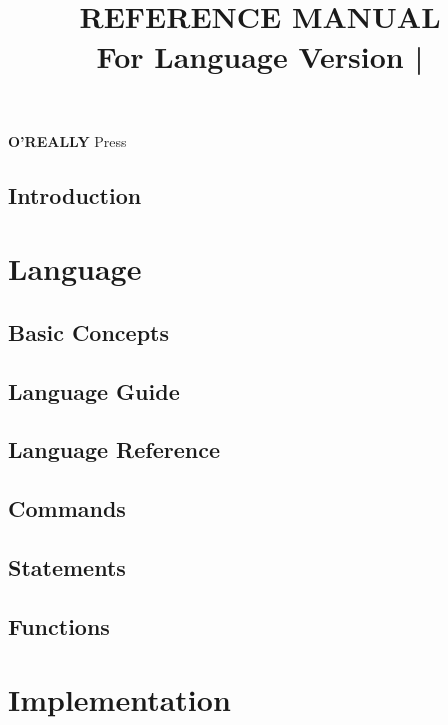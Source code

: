 \documentclass[10pt, stock, openany, chapter]{memoir}
\title{\HUGE\textbf{\MakeUppercase{\tbas} \\ REFERENCE MANUAL} \\ \Large \vspace{1em} For Language Version \tbasver\hspace{0.75em}|\hspace{0.75em}\theedition}
\date{}
\author{}
\newcommand{\oreallypress}{\begingroup\hspace{0.083em}\large\textbf{O'REALLY\raisebox{1ex}{\scriptsize ?}} \large Press\endgroup}
\begin{document}
\maketitle{}
\thispagestyle{empty}
\vfill
\oreallypress

\newpage


\thispagestyle{empty}

\newpage

\setcounter{page}{3}
\tableofcontents*



\openright
\chapter{Introduction}


\openany
\part{Language}

\chapter{Basic Concepts}


\chapter{Language Guide}


\chapter{Language Reference}


\chapter{Commands}


\chapter{Statements}


\chapter{Functions}


\part{Implementation}
\end{document}
